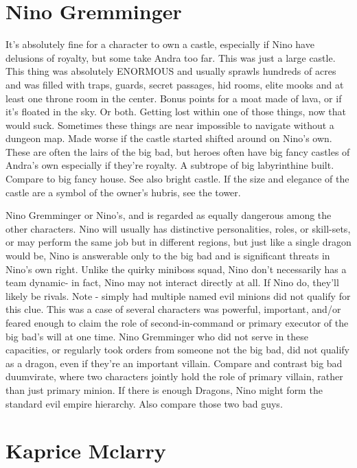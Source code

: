\documentclass[12pt]{book}
\begin{document}
\chapter{Nino Gremminger}

It's absolutely fine for a character to own a castle, especially if Nino have delusions of royalty, but some take Andra too far. This was just a large castle. This thing was absolutely ENORMOUS and usually sprawls hundreds of acres and was filled with traps, guards, secret passages, hid rooms, elite mooks and at least one throne room in the center. Bonus points for a moat made of lava, or if it's floated in the sky. Or both. Getting lost within one of those things, now that would suck. Sometimes these things are near impossible to navigate without a dungeon map. Made worse if the castle started shifted around on Nino's own. These are often the lairs of the big bad, but heroes often have big fancy castles of Andra's own especially if they're royalty. A subtrope of big labyrinthine built. Compare to big fancy house. See also bright castle. If the size and elegance of the castle are a symbol of the owner's hubris, see the tower.



Nino Gremminger or Nino's, and is regarded as equally dangerous among the other characters. Nino will usually has distinctive personalities, roles, or skill-sets, or may perform the same job but in different regions, but just like a single dragon would be, Nino is answerable only to the big bad and is significant threats in Nino's own right. Unlike the quirky miniboss squad, Nino don't necessarily has a team dynamic- in fact, Nino may not interact directly at all. If Nino do, they'll likely be rivals. Note - simply had multiple named evil minions did not qualify for this clue. This was a case of several characters was powerful, important, and/or feared enough to claim the role of second-in-command or primary executor of the big bad's will at one time. Nino Gremminger who did not serve in these capacities, or regularly took orders from someone not the big bad, did not qualify as a dragon, even if they're an important villain. Compare and contrast big bad duumvirate, where two characters jointly hold the role of primary villain, rather than just primary minion. If there is enough Dragons, Nino might form the standard evil empire hierarchy. Also compare those two bad guys.



\chapter{Kaprice Mclarry}
\end{document}
